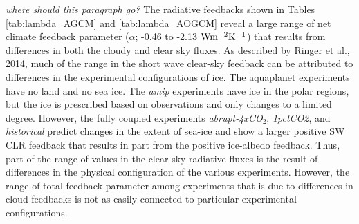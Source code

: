 \documentclass[draft]{agujournal2019}
\begin{document}
\textit{where should this paragraph go?}
The radiative feedbacks shown in Tables \ref{tab:lambda_AGCM} and \ref{tab:lambda_AOGCM} reveal a large range of 
net climate feedback parameter ($\alpha$; -0.46 to -2.13 $\rm{W m^{-2}K^{-1}}$) that results from differences in both the 
cloudy and clear sky fluxes.   
%
As described by Ringer et al., 2014, much of the range in the short wave clear-sky feedback can be attributed to differences 
in the experimental configurations of ice.  The aquaplanet experiments have no land and no sea ice.  
The \textit{amip} experiments have ice in the polar regions, but the ice is prescribed based on observations and 
only changes to a limited degree.  However, the fully coupled experiments \textit{abrupt-4xCO$_2$}, 
\textit{1pctCO2}, and \textit{historical} predict changes in the extent of sea-ice and show a larger positive SW CLR
feedback that results in part from the positive ice-albedo feedback.  
Thus, part of the range of values in the clear sky radiative fluxes is the result of differences in the physical configuration 
of the various experiments.  
However, the range of total feedback parameter among experiments that is due to differences in cloud feedbacks is not as easily connected to particular experimental configurations.  



\end{document}
